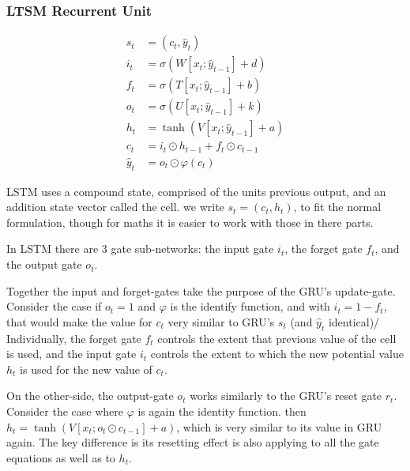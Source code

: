 \documentclass[12pt,parskip]{komatufte}
\begin{document}
\subsubsection{LTSM Recurrent Unit}\label{sec:ltsm}

\begin{align}
s_t &= (c_t, \hat{y}_t)\\
%
i_t &= \sigma \left( W[x_t; \hat{y}_{t-1}] + d \right) \\
f_t &= \sigma \left( T[x_t; \hat{y}_{t-1}] + b \right) \\
o_t &= \sigma \left( U[x_t; \hat{y}_{t-1}] + k \right) \\
%
h_t &= \tanh \left( V[x_t; \hat{y}_{t-1}] + a \right) \\
c_t &=  i_t\odot h_{t-1} + f_t \odot c_{t-1} \\
\hat{y}_t &= o_t \odot \varphi(c_t)
\end{align}

LSTM uses a compound state, comprised of the units previous output, and an addition state vector called the cell.
we write $s_t = (c_t, h_t)$,
to fit the normal formulation,
though for maths it is easier to work with those in there parts.

In LSTM there are 3 gate sub-networks:
the input gate $i_t$, the forget gate $f_t$, and the output gate $o_t$.

Together the input and forget-gates take the purpose of the GRU's update-gate.
Consider the case if $o_t=1$ and $\varphi$ is the identify function,
and with $i_t=1-f_t$, that would make the value for $c_t$ very similar to GRU's $s_t$ (and $\hat{y}_t$ identical)/
Individually, the forget gate $f_t$ controls the extent that previous value of the cell is used,
and the input gate $i_t$ controls the extent to which the new potential value $h_t$ is used for the new value of $c_t$.

On the other-side, the output-gate $o_t$ works similarly to the GRU's reset gate $r_t$.
Consider the case where $\varphi$ is again the identity function.
then $h_t = \tanh \left( V[x_t; o_t\odot c_{t-1}] + a \right)$,
which is very similar to its value in GRU again.
The key difference is its resetting effect is also applying to all the gate equations as well as to $h_t$.
\end{document}
